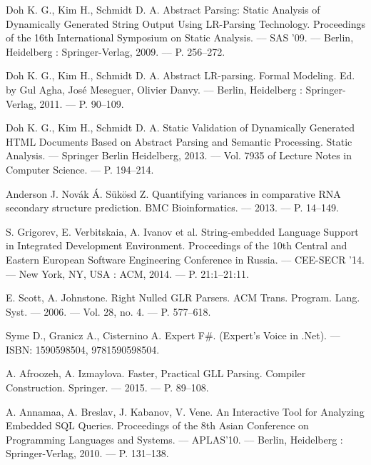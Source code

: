 \begin{thebibliography}{99}

  Doh K. G., Kim H., Schmidt D. A. 
  Abstract Parsing: Static Analysis of Dynamically Generated String Output Using LR-Parsing Technology. 
  Proceedings of the 16th International Symposium on Static Analysis. –– SAS ’09. –– Berlin, Heidelberg : Springer-Verlag, 2009. –– P. 256–272.

  Doh K. G., Kim H., Schmidt D. A. 
  Abstract LR-parsing. 
  Formal Modeling. Ed. by Gul Agha, José Meseguer, Olivier Danvy. –– Berlin, Heidelberg : Springer-Verlag, 2011. –– P. 90–109.

  Doh K. G., Kim H., Schmidt D. A. 
  Static Validation of Dynamically Generated HTML Documents Based on Abstract Parsing and Semantic Processing.
  Static Analysis. –– Springer Berlin Heidelberg, 2013. –– Vol. 7935 of Lecture Notes in Computer Science. –– P. 194–214.
                                                                                                                         
  Anderson J. Nov{\'a}k {\'A}. Sükösd Z. 
  Quantifying variances in comparative RNA secondary structure prediction.
  BMC Bioinformatics. –– 2013. –– P. 14–149. 

  S. Grigorev, E. Verbitskaia, A. Ivanov et al.
  String-embedded Language Support in Integrated Development Environment.
  Proceedings of the 10th Central and Eastern European Software Engineering Conference in Russia. –– CEE-SECR ’14. –– New York, NY, USA : ACM, 2014. –– P. 21:1–21:11.

  E. Scott, A. Johnstone.
  Right Nulled GLR Parsers. 
  ACM Trans. Program. Lang. Syst. — 2006. — Vol. 28, no. 4. — P. 577–618.
                                                                                                                                                          
  Syme D., Granicz A., Cisternino A. 
  Expert F\#.
  (Expert’s Voice in .Net). –– ISBN: 1590598504, 9781590598504.

  A. Afroozeh, A. Izmaylova.
  Faster, Practical GLL Parsing.
  Compiler Construction. Springer. — 2015. — P. 89–108.                                                                                                   

  A. Annamaa, A. Breslav, J. Kabanov, V. Vene.
  An Interactive Tool for Analyzing Embedded SQL Queries.
  Proceedings of the 8th Asian Conference on Programming Languages and Systems. –– APLAS’10. –– Berlin, Heidelberg : Springer-Verlag, 2010. –– P. 131–138.


\end{thebibliography}
